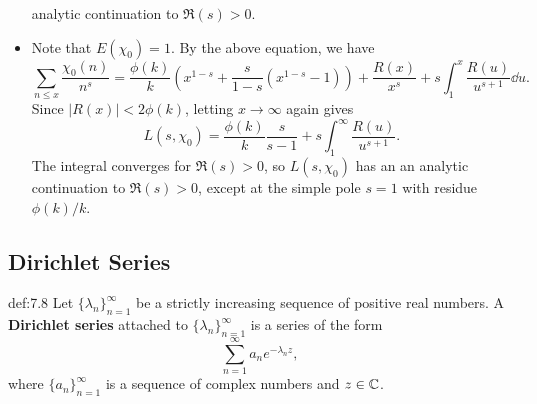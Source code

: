 \begin{pf}
\begin{itemize}
        analytic continuation to $\Re(s) > 0$. 
        \item Note that $E(\chi_0) = 1$. By the above equation, we have 
        \[ \sum_{n\leq x} \frac{\chi_0(n)}{n^s} = \frac{\phi(k)}{k} \left( x^{1-s} + 
        \frac{s}{1-s} (x^{1-s} - 1) \right) + \frac{R(x)}{x^s} + s \int_1^x 
        \frac{R(u)}{u^{s+1}}\dd u. \]
        Since $|R(x)| < 2\phi(k)$, letting $x \to \infty$ again gives 
        \[ L(s, \chi_0) = \frac{\phi(k)}{k} \frac{s}{s-1} + s \int_1^\infty 
        \frac{R(u)}{u^{s+1}}. \] 
        The integral converges for $\Re(s) > 0$, so $L(s, \chi_0)$ has an an analytic 
        continuation to $\Re(s) > 0$, except at the simple pole $s = 1$ with 
        residue $\phi(k)/k$. \qedhere 
    \end{itemize}
\end{pf}

\subsection{Dirichlet Series}\label{subsec:7.5}

\vspace{2ex}
\begin{defn}{def:7.8}  
    Let $\{\lambda_n\}_{n=1}^\infty$ be a strictly increasing sequence of 
    positive real numbers. A {\bf Dirichlet series} attached to 
    $\{\lambda_n\}_{n=1}^\infty$ is a series of the form 
    \[ \sum_{n=1}^\infty a_n e^{-\lambda_n z}, \] 
    where $\{a_n\}_{n=1}^\infty$ is a sequence of complex numbers and $z \in \mathbb{C}$. 
\end{defn}

